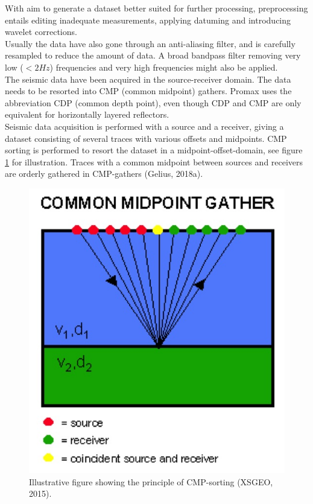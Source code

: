 \documentclass[10pt,a4paper]{article}
\begin{document}
With aim to generate a dataset better suited for further processing, preprocessing entails editing inadequate measurements, applying datuming and introducing wavelet corrections.
\\
Usually the data have also gone through an anti-aliasing filter, and is carefully resampled to reduce the amount of data. A broad bandpass filter removing very low ($<2Hz$) frequencies and very high frequencies might also be applied.
\\
The seismic data have been acquired in the source-receiver domain. The data needs to be resorted into CMP (common midpoint) gathers. Promax uses the abbreviation CDP (common depth point), even though CDP and CMP are only equivalent for horizontally layered reflectors.
\\
Seismic data acquisition is performed with a source and a receiver, giving a dataset consisting of several traces with various offsets and midpoints. CMP sorting is performed to resort the dataset in a midpoint-offset-domain, see figure \ref{fig1} for illustration. Traces with a common midpoint between sources and receivers are orderly gathered in CMP-gathers (Gelius, 2018a).


\begin{figure}[H]
\centering
\includegraphics[scale=0.4]{fig1.jpg}
\caption{Illustrative figure showing the principle of CMP-sorting (XSGEO, 2015).}
\label{fig1}
\end{figure}
\end{document}
